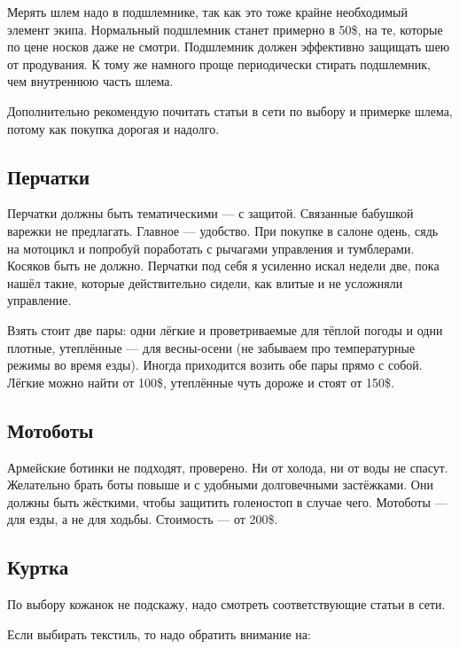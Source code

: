 \documentclass[12pt,a4paper]{article}
\begin{document}
Мерять шлем надо в подшлемнике, так как это тоже крайне необходимый
элемент экипа. Нормальный подшлемник станет примерно в 50\$, на те,
которые по цене носков даже не смотри. Подшлемник должен эффективно
защищать шею от продувания. К тому же намного проще периодически
стирать подшлемник, чем внутреннюю часть шлема.

Дополнительно рекомендую почитать статьи в сети по выбору и примерке
шлема, потому как покупка дорогая и надолго.

\subsection{Перчатки}

Перчатки должны быть тематическими --- с защитой. Связанные бабушкой
варежки не предлагать. Главное --- удобство. При покупке в салоне одень,
сядь на мотоцикл и попробуй поработать с рычагами управления и
тумблерами. Косяков быть не должно. Перчатки под себя я усиленно искал
недели две, пока нашёл такие, которые действительно сидели, как влитые
и не усложняли управление.

Взять стоит две пары: одни лёгкие и проветриваемые для тёплой погоды и
одни плотные, утеплённые --- для весны-осени (не забываем про
температурные режимы во время езды). Иногда приходится возить обе пары
прямо с собой. Лёгкие можно найти от 100\$, утеплённые чуть дороже и
стоят от 150\$.

\subsection{Мотоботы}

Армейские ботинки не подходят, проверено. Ни от холода, ни от воды не
спасут. Желательно брать боты повыше и с удобными долговечными
застёжками. Они должны быть жёсткими, чтобы защитить голеностоп в
случае чего. Мотоботы --- для езды, а не для ходьбы. Стоимость --- от 200\$.

\subsection{Куртка}

По выбору кожанок не подскажу, надо смотреть соответствующие статьи
в сети.

Если выбирать текстиль, то надо обратить внимание на:
\end{document}
